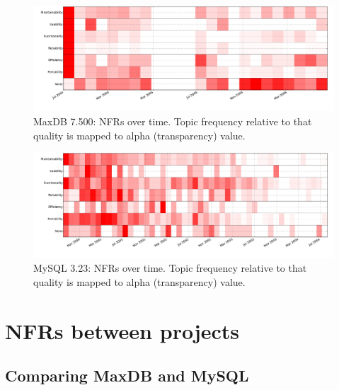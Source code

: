 \documentclass[]{sig-alternate}
\begin{document}


\begin{figure}
  \centering
  \includegraphics[width=\textwidth]{figures/maxdb-timeline}
  \caption{MaxDB 7.500: NFRs over time. Topic frequency relative to that quality is mapped to alpha (transparency) value.}
 \label{fig:maxdb}
\end{figure}

\begin{figure}%
  \centering
  \includegraphics[width=\textwidth]{figures/mysql-timeline}
  \caption{MySQL 3.23: NFRs over time. Topic frequency relative to that quality is mapped to alpha (transparency) value.}
  \label{fig:mysql}
\end{figure}

\section{NFRs between projects}

\subsection{Comparing MaxDB and MySQL}
\end{document}
